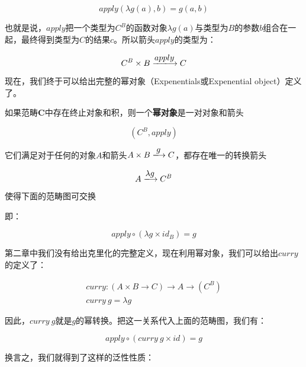 \documentclass{article}
\begin{document}
\[
apply(\lambda g(a), b) = g(a, b)
\]

也就是说，$apply$把一个类型为$C^B$的函数对象$\lambda g(a)$与类型为$B$的参数$b$组合在一起，最终得到类型为$C$的结果$c$。所以箭头$apply$的类型为：

\[
C^B \times B \arrowto{apply} C
\]

现在，我们终于可以给出完整的幂对象（Expenentials或Expenential object）定义了。

\begin{definition}
如果范畴$\pmb{C}$中存在终止对象和积，则一个\textbf{幂对象}是一对对象和箭头

\[
(C^B, apply)
\]

它们满足对于任何的对象$A$和箭头$A \times B \arrowto{g} C$，都存在唯一的转换箭头

\[
 A \arrowto{\lambda g} C^B
\]

使得下面的范畴图可交换

\begin{center}
\end{center}

即：

\[
  apply \circ (\lambda g \times id_B) = g
\]

\end{definition}

第二章中我们没有给出克里化的完整定义，现在利用幂对象，我们可以给出$curry$的定义了：

\[
\begin{array}{l}
curry : (A \times B \to C) \to A \to (C^B) \\
curry\ g = \lambda g
\end{array}
\]

因此，$curry\ g$就是$g$的幂转换。把这一关系代入上面的范畴图，我们有：

\[
  apply \circ (curry\ g \times id) = g
\]

换言之，我们就得到了这样的泛性性质：
\end{document}
